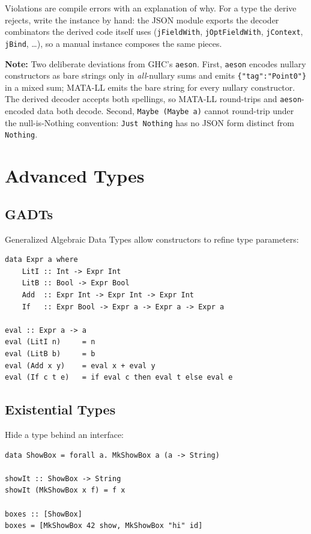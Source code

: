 \documentclass[11pt,a4paper]{article}
\newenvironment{note}{%
  \def\FrameCommand{\fboxsep=3mm \colorbox{notebg}}%
  \MakeFramed{\advance\hsize-\width \FrameRestore}%
  \noindent\textbf{Note:} }%
  {\endMakeFramed}
\begin{document}
Violations are compile errors with an explanation of why.  For a type
the derive rejects, write the instance by hand: the JSON module exports
the decoder combinators the derived code itself uses
(\texttt{jFieldWith}, \texttt{jOptFieldWith}, \texttt{jContext},
\texttt{jBind}, \ldots), so a manual instance composes the same pieces.

\begin{note}
Two deliberate deviations from GHC's \texttt{aeson}.  First,
\texttt{aeson} encodes nullary constructors as bare strings only in
\emph{all}-nullary sums and emits \texttt{\{"tag":"Point0"\}} in a
mixed sum; MATA-LL emits the bare string for every nullary
constructor.  The derived decoder accepts both spellings, so MATA-LL
round-trips and \texttt{aeson}-encoded data both decode.  Second,
\texttt{Maybe (Maybe a)} cannot round-trip under the null-is-Nothing
convention: \texttt{Just Nothing} has no JSON form distinct from
\texttt{Nothing}.
\end{note}

\section{Advanced Types}

\subsection{GADTs}

Generalized Algebraic Data Types allow constructors to refine type
parameters:

\begin{lstlisting}
data Expr a where
    LitI :: Int -> Expr Int
    LitB :: Bool -> Expr Bool
    Add  :: Expr Int -> Expr Int -> Expr Int
    If   :: Expr Bool -> Expr a -> Expr a -> Expr a

eval :: Expr a -> a
eval (LitI n)     = n
eval (LitB b)     = b
eval (Add x y)    = eval x + eval y
eval (If c t e)   = if eval c then eval t else eval e
\end{lstlisting}

\subsection{Existential Types}

Hide a type behind an interface:

\begin{lstlisting}
data ShowBox = forall a. MkShowBox a (a -> String)

showIt :: ShowBox -> String
showIt (MkShowBox x f) = f x

boxes :: [ShowBox]
boxes = [MkShowBox 42 show, MkShowBox "hi" id]
\end{lstlisting}
\end{document}
